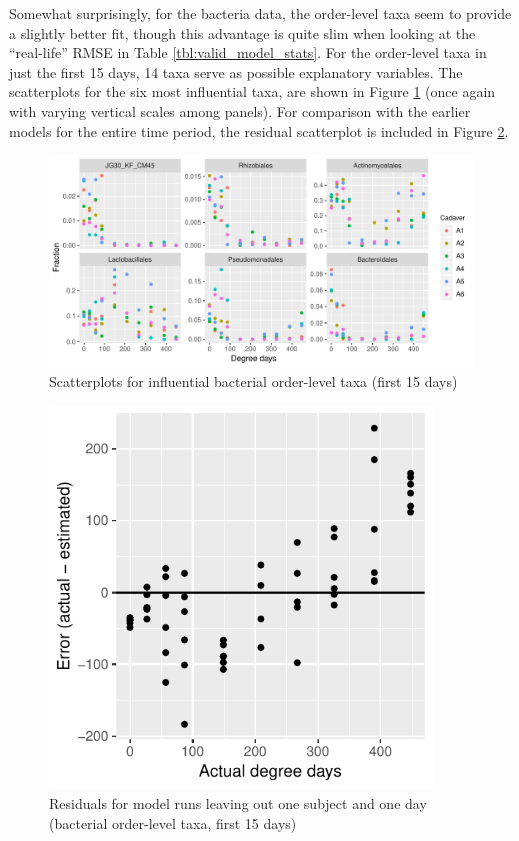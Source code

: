 \documentclass{article}
\begin{document}
Somewhat surprisingly, for the bacteria data, the order-level taxa
seem to provide a slightly better fit, though this advantage is quite
slim when looking at the ``real-life'' RMSE in Table
\ref{tbl:valid_model_stats}.  For the order-level taxa in just the
first 15 days, 14 taxa serve as possible explanatory variables.  The
scatterplots for the six most influential taxa, are shown in Figure
\ref{fig:infl_bac_first_15_days_family_scatter} (once again with
varying vertical scales among panels).  For comparison with the
earlier models for the entire time period, the residual scatterplot is
included in Figure \ref{fig:leave_one_out_resids_bac_order_taxa_first_15}.
\begin{figure}
  \centering
  \includegraphics[width=6.5in]{../revise_algorithm/only_orders/first_two_weeks/hit_1perc_twice/infl_bac_order_first_two_weeks_scatter}
  \caption{Scatterplots for influential bacterial order-level taxa (first 15 days)}
  \label{fig:infl_bac_first_15_days_family_scatter}
\end{figure}
\begin{figure}
  \centering
  \includegraphics[width=4in]{../revise_algorithm/only_orders/first_two_weeks/hit_1perc_twice/leave_out_one_subj_and_one_day_residuals}
  \caption{Residuals for model runs leaving out one subject and one day (bacterial order-level taxa, first 15 days)}
  \label{fig:leave_one_out_resids_bac_order_taxa_first_15}
\end{figure}
\end{document}
